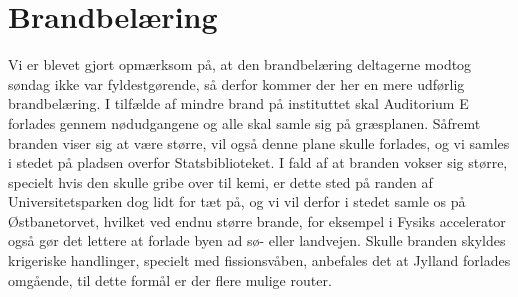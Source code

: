 \begin{minipage}[b]{0.95\linewidth}
\begin{minipage}[t]{0.47\textwidth}
%
\vspace{2mm}
\section*{Brandbelæring}
Vi er blevet gjort opmærksom på, at den brandbelæring deltagerne modtog søndag ikke var fyldestgørende, så derfor kommer der her en mere udførlig brandbelæring. I tilfælde af mindre brand på instituttet skal Auditorium E forlades gennem nødudgangene og alle skal samle sig på græsplanen. Såfremt branden viser sig at være større, vil også denne plane skulle forlades, og vi samles i stedet på pladsen overfor Statsbiblioteket. I fald af at branden vokser sig større, specielt hvis den skulle gribe over til kemi, er dette sted på randen af Universitetsparken dog lidt for tæt på, og vi vil derfor i stedet samle os på Østbanetorvet, hvilket ved endnu større brande, for eksempel i Fysiks accelerator også gør det lettere at forlade byen ad sø- eller landvejen. Skulle branden skyldes krigeriske handlinger, specielt med fissionsvåben, anbefales det at Jylland forlades omgående, til dette formål er der flere mulige router. 


\end{minipage}
\end{minipage}
